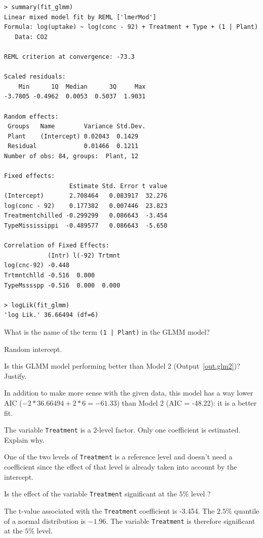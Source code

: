 \documentclass[11pt,a4paper%
addpoints, 
answers%
]{exam}
\begin{document}
\begin{questions}
\begin{center}
\begin{verbatim}
> summary(fit_glmm)
Linear mixed model fit by REML ['lmerMod']
Formula: log(uptake) ~ log(conc - 92) + Treatment + Type + (1 | Plant)
   Data: CO2

REML criterion at convergence: -73.3

Scaled residuals: 
    Min      1Q  Median      3Q     Max 
-3.7805 -0.4962  0.0053  0.5037  1.9031 

Random effects:
 Groups   Name        Variance Std.Dev.
 Plant    (Intercept) 0.02043  0.1429  
 Residual             0.01466  0.1211  
Number of obs: 84, groups:  Plant, 12

Fixed effects:
                  Estimate Std. Error t value
(Intercept)       2.708464   0.083917  32.276
log(conc - 92)    0.177382   0.007446  23.823
Treatmentchilled -0.299299   0.086643  -3.454
TypeMississippi  -0.489577   0.086643  -5.650

Correlation of Fixed Effects:
            (Intr) l(-92) Trtmnt
log(cnc-92) -0.448              
Trtmntchlld -0.516  0.000       
TypeMsssspp -0.516  0.000  0.000

> logLik(fit_glmm)
'log Lik.' 36.66494 (df=6)

\end{verbatim}
\end{center}

\question[1] What is the name of the term \texttt{(1 | Plant)} in the GLMM model?

\begin{solution}
Random intercept.
\end{solution}

\question[2] Is this GLMM model performing better than Model 2 (Output~\ref{out.glm2})? Justify. 
\begin{solution}
	In addition to make more sense with the given data, this model has a way lower AIC ($-2*36.66494 + 2*6 = -61.33$) than Model 2 (AIC = -48.22): it is a better fit.
\end{solution}
\question[2] The variable \texttt{Treatment} is a 2-level factor. Only one coefficient is estimated. Explain why. 
\begin{solution}
	One of the two levels of \texttt{Treatment} is a reference level and doesn't need a coefficient since the effect of that level is already taken into account by the intercept. 
\end{solution}
\question[2] Is the effect of the variable \texttt{Treatment} significant at the $5\%$ level ? 
\label{trt.question}
\begin{solution}
The t-value associated with the \texttt{Treatment} coefficient is -3.454. The $2.5\%$ quantile of a normal distribution is $-1.96$. The variable \texttt{Treatment} is therefore significant at the $5\%$ level.
\end{solution}


\end{questions}
\end{document}
